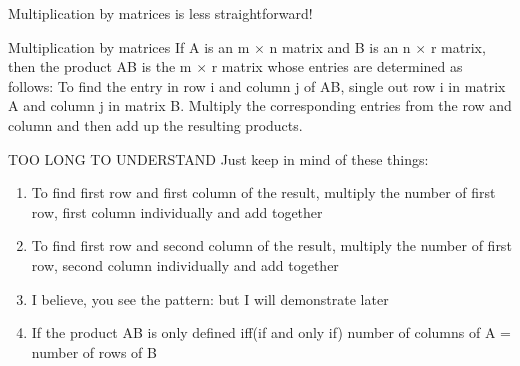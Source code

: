 \documentclass[
	11pt, %
]{beamer}
\begin{document}
\begin{frame}{Multiplication by matrices is less straightforward!}
    \begin{block}{Multiplication by matrices}
        If A is an m $\times$ n matrix and B is an n $\times$ r matrix, then the product AB is the m $\times$ r matrix
        whose entries are determined as follows:
        To find the entry in row i and column j of AB, single out row i in matrix A and
        column j in matrix B. Multiply the corresponding entries from the row and column
        and then add up the resulting products.
    \end{block}
\end{frame}

\begin{frame}
    \begin{alertblock}{TOO LONG TO UNDERSTAND}
        Just keep in mind of these things:
        \begin{enumerate}
            \item To find first row and first column of the result, multiply the number of first row, first column individually and add together
            \item To find first row and second column of the result, multiply the number of first row, second column individually and add together
            \item I believe, you see the pattern: but I will demonstrate later
            \item If the product AB is only defined iff(if and only if) \alert{number of columns of A = number of rows of B}
        \end{enumerate}
    \end{alertblock}
\end{frame}
\end{document}
